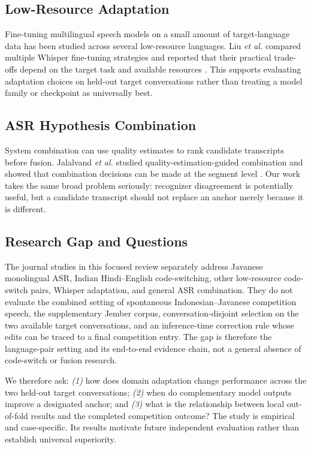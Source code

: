 \documentclass[journal]{IEEEtran}
\begin{document}
\subsection{Low-Resource Adaptation}
Fine-tuning multilingual speech models on a small amount of target-language data has been studied across several low-resource languages. Liu \emph{et al.} compared multiple Whisper fine-tuning strategies and reported that their practical trade-offs depend on the target task and available resources \cite{liu}. This supports evaluating adaptation choices on held-out target conversations rather than treating a model family or checkpoint as universally best.

\subsection{ASR Hypothesis Combination}
System combination can use quality estimates to rank candidate transcripts before fusion. Jalalvand \emph{et al.} studied quality-estimation-guided combination and showed that combination decisions can be made at the segment level \cite{jalalvand}. Our work takes the same broad problem seriously: recognizer disagreement is potentially useful, but a candidate transcript should not replace an anchor merely because it is different.

\subsection{Research Gap and Questions}
The journal studies in this focused review separately address Javanese monolingual ASR, Indian Hindi--English code-switching, other low-resource code-switch pairs, Whisper adaptation, and general ASR combination. They do not evaluate the combined setting of spontaneous Indonesian--Javanese competition speech, the supplementary Jember corpus, conversation-disjoint selection on the two available target conversations, and an inference-time correction rule whose edits can be traced to a final competition entry. The gap is therefore the language-pair setting and its end-to-end evidence chain, not a general absence of code-switch or fusion research.

We therefore ask: \emph{(1)} how does domain adaptation change performance across the two held-out target conversations; \emph{(2)} when do complementary model outputs improve a designated anchor; and \emph{(3)} what is the relationship between local out-of-fold results and the completed competition outcome? The study is empirical and case-specific. Its results motivate future independent evaluation rather than establish universal superiority.
\end{document}
